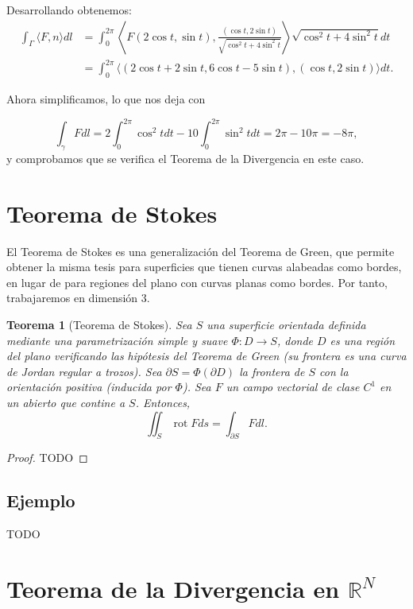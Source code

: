 \documentclass[12pt,spanish]{article}
\newtheorem{theorem}{Teorema}[section]
\theoremstyle{definition}
\theoremstyle{remark}
\begin{document}
Desarrollando obtenemos:
\begin{align*}
\int_\Gamma \langle F,n\rangle dl&=\int_0^{2\pi} \left\langle F(2\cos t, \sin t),\frac{(\cos t,2\sin t)}{\sqrt{\cos^2 t+4\sin^2 t}}\right\rangle\sqrt{\cos^2 t+4\sin^2 t} dt \\
&=\int_0^{2\pi} \langle (2\cos t+2\sin t,6\cos t-5\sin t),(\cos t,2\sin t)\rangle dt.
\end{align*}

Ahora simplificamos, lo que nos deja con

\[\int_\gamma F dl=2\int_0^{2\pi}\cos^2 t dt -10\int_0^{2\pi}\sin^2 t dt =2\pi-10\pi=-8\pi,\]
y comprobamos que se verifica el Teorema de la Divergencia en este caso.

\section{Teorema de Stokes}

El Teorema de Stokes es una generalización del Teorema de Green, que permite obtener la misma tesis para superficies que tienen curvas alabeadas como bordes, en lugar de para regiones del plano con curvas planas como bordes. Por tanto, trabajaremos en dimensión 3.

\begin{theorem}[Teorema de Stokes]
	Sea $S$ una superficie orientada definida mediante una parametrización simple y suave $\Phi:D\rightarrow S$, donde $D$ es una región del plano verificando las hipótesis del Teorema de Green (su frontera es una curva de Jordan regular a trozos). Sea $\partial S=\Phi(\partial D)$ la frontera de $S$ con la orientación positiva (inducida por $\Phi$). Sea $F$ un campo vectorial de clase $C^1$ en un abierto que contine a $S$. Entonces,
	\[\iint_S \operatorname{rot}F ds=\int_{\partial S} F dl.\]
\end{theorem}

\begin{proof}
	TODO
\end{proof}

\subsection*{Ejemplo}

TODO

\section{Teorema de la Divergencia en $\mathbb{R}^N$}
\end{document}
